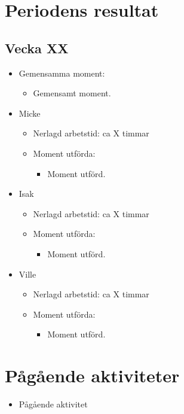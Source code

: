 \section{Periodens resultat}
\subsection*{Vecka XX}

\begin{itemize}[noitemsep]
    \item Gemensamma moment:
    \begin{itemize}[noitemsep]
        \item Gemensamt moment.
    \end{itemize}
    \item Micke
    \begin{itemize}[noitemsep]
        \item Nerlagd arbetstid: ca X timmar
        \item Moment utförda:
        \begin{itemize}[noitemsep]
            \item Moment utförd.
        \end{itemize}
    \end{itemize}
    \item Isak
    \begin{itemize}[noitemsep]
        \item Nerlagd arbetstid: ca X timmar
        \item Moment utförda:
        \begin{itemize}[noitemsep]
            \item Moment utförd.
        \end{itemize}
    \end{itemize}
    \item Ville
    \begin{itemize}[noitemsep]
        \item Nerlagd arbetstid: ca X timmar
        \item Moment utförda:
        \begin{itemize}[noitemsep]
            \item Moment utförd.
        \end{itemize}
    \end{itemize}
\end{itemize}

\section{Pågående aktiviteter}
\begin{itemize}[noitemsep]
    \item Pågående aktivitet
\end{itemize}

